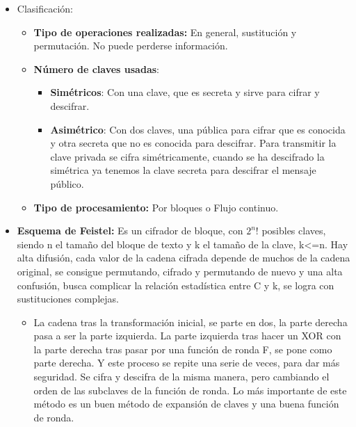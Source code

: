 \documentclass[12pt, twoside, openright]{report} %
\begin{document}
  \begin{itemize}
  \item Clasificación:
    

    \begin{itemize}
    \item \textbf{Tipo de operaciones realizadas:} En general, sustitución y
      permutación. No puede perderse información.
      
    \item \textbf{Número de claves usadas}:
      

      \begin{itemize}
      \item \textbf{Simétricos}: Con una clave, que es secreta y sirve para
        cifrar y descifrar.
        
      \item \textbf{Asimétrico}: Con dos claves, una pública para cifrar que
        es conocida y otra secreta que no es conocida para descifrar.
        Para transmitir la clave privada se cifra simétricamente, cuando
        se ha descifrado la simétrica ya tenemos la clave secreta para
        descifrar el mensaje público.
        
      \end{itemize}
    \item \textbf{Tipo de procesamiento:} Por bloques o Flujo continuo.
      
    \end{itemize}
  \item \textbf{Esquema de Feistel:} Es un cifrador de bloque, con $2^n$!
    posibles claves, siendo n el tamaño del bloque de texto y k el
    tamaño de la clave, k\textless=n. Hay alta difusión, cada valor de
    la cadena cifrada depende de muchos de la cadena original, se
    consigue permutando, cifrado y permutando de nuevo y una alta
    confusión, busca complicar la relación estadística entre C y k, se
    logra con sustituciones complejas.
    

    \begin{itemize}
    \item La cadena tras la transformación inicial, se parte en dos, la
      parte derecha pasa a ser la parte izquierda. La parte izquierda
      tras hacer un XOR con la parte derecha tras pasar por una función
      de ronda F, se pone como parte derecha. Y este proceso se repite
      una serie de veces, para dar más seguridad. Se cifra y descifra de
      la misma manera, pero cambiando el orden de las subclaves de la
      función de ronda. Lo más importante de este método es un buen
      método de expansión de claves y una buena función de ronda.
      

\end{itemize}
\end{itemize}
\end{document}
